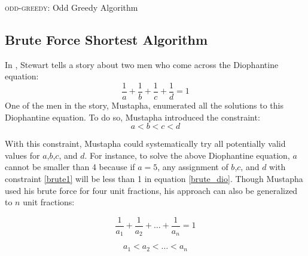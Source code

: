 \documentclass[paper=a4, fontsize=11pt]{scrartcl}
\numberwithin{equation}{section}	 %
\numberwithin{figure}{section}	 %
\numberwithin{table}{section}	 %
\begin{document}
\begin{algorithm}[t]
\caption{\textsc{odd-greedy}: Odd Greedy Algorithm}
\label{alg:two}
\end{algorithm}

\subsection{Brute Force Shortest Algorithm}
In \cite{stewart}, Stewart tells a story about two men who come across the Diophantine equation:
\begin{equation}\label{brute_dio}
	\frac{1}{a} + \frac{1}{b} + \frac{1}{c} + \frac{1}{d} = 1
\end{equation}
One of the men in the story, Mustapha, enumerated all the solutions to this Diophantine equation. To do so, Mustapha introduced the constraint:
\begin{equation}\label{brute1}
	a < b < c < d
\end{equation}

With this constraint, Mustapha could systematically try all potentially valid values for $a$,$b$,$c$, and $d$. For instance, to solve the above Diophantine equation, $a$ cannot be smaller than 4 because if $a=5$, any assignment of $b$,$c$, and $d$ with constraint \ref{brute1} will be less than 1 in equation \ref{brute_dio}. Though Mustapha used his brute force for four unit fractions, his approach can also be generalized to $n$ unit fractions:

\begin{equation}
	\frac{1}{a_1} + \frac{1}{a_2} + \ldots + \frac{1}{a_n} = 1
\end{equation}

\begin{equation}\label{brute2}
	a_1 < a_2 < \ldots < a_n
\end{equation}
\end{document}
